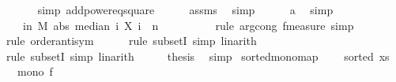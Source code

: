 \begin{isabellebody}
\ \ \ \ \ \isamarkupfalse%
\ {\isacharparenleft}{\kern0pt}simp\ add{\isacharcolon}{\kern0pt}power{}{\isacharunderscore}{\kern0pt}eq{\isacharunderscore}{\kern0pt}square{\isacharparenright}{\kern0pt}\isanewline
\ \ \ \ \isamarkupfalse%
\ assms{\isacharparenleft}{\kern0pt}{}{\isacharparenright}{\kern0pt}\ \isamarkupfalse%
\ simp\isanewline
\ \ \ \ \isamarkupfalse%
\ a\ \isamarkupfalse%
\ simp\isanewline
\ \ \isamarkupfalse%
\ \isamarkupfalse%
\ {\isachardoublequoteopen}{\isachardot}{\kern0pt}{\isachardot}{\kern0pt}{\isachardot}{\kern0pt}\ {\isacharequal}{\kern0pt}\ {\isasymP}{\isacharparenleft}{\kern0pt}{\isasymomega}\ in\ M{\isachardot}{\kern0pt}\ abs\ {\isacharparenleft}{\kern0pt}median\ {\isacharparenleft}{\kern0pt}{\isasymlambda}i{\isachardot}{\kern0pt}\ X\ i\ {\isasymomega}{\isacharparenright}{\kern0pt}\ n\ {\isacharminus}{\kern0pt}\ {\isasymmu}{\isacharparenright}{\kern0pt}\ {\isasymle}\ {\isasymdelta}{\isacharparenright}{\kern0pt}{\isachardoublequoteclose}\isanewline
\ \ \ \ \isamarkupfalse%
\ {\isacharparenleft}{\kern0pt}rule\ arg{\isacharunderscore}{\kern0pt}cong{}{\isacharbrackleft}{\kern0pt}\ f{\isacharequal}{\kern0pt}{\isachardoublequoteopen}measure{\isachardoublequoteclose}{\isacharbrackright}{\kern0pt}{\isacharcomma}{\kern0pt}\ simp{\isacharparenright}{\kern0pt}\isanewline
\ \ \ \ \isamarkupfalse%
\ {\isacharparenleft}{\kern0pt}rule\ order{\isacharunderscore}{\kern0pt}antisym{\isacharparenright}{\kern0pt}\isanewline
\ \ \ \ \isamarkupfalse%
\ {\isacharparenleft}{\kern0pt}rule\ subsetI{\isacharcomma}{\kern0pt}\ simp{\isacharcomma}{\kern0pt}\ linarith{\isacharparenright}{\kern0pt}\isanewline
\ \ \ \ \isamarkupfalse%
\ {\isacharparenleft}{\kern0pt}rule\ subsetI{\isacharcomma}{\kern0pt}\ simp{\isacharcomma}{\kern0pt}\ linarith{\isacharparenright}{\kern0pt}\isanewline
\ \ \isamarkupfalse%
\ \isamarkupfalse%
\ {\isacharquery}{\kern0pt}thesis\ \isamarkupfalse%
\ simp\isanewline
{}\isamarkupfalse%
%
\endisatagproof
{\isafoldproof}%
%
\isadelimproof
\isanewline
%
\endisadelimproof
\isanewline
{}\isamarkupfalse%
\ sorted{\isacharunderscore}{\kern0pt}mono{\isacharunderscore}{\kern0pt}map{\isacharcolon}{\kern0pt}\ \isanewline
\ \ \ {\isachardoublequoteopen}sorted\ xs{\isachardoublequoteclose}\isanewline
\ \ \ {\isachardoublequoteopen}mono\ f{\isachardoublequoteclose}\isanewline

\end{isabellebody}
